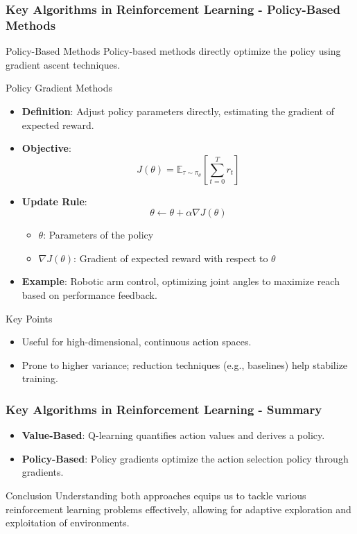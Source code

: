 \documentclass[aspectratio=169]{beamer}
\begin{document}
\begin{frame}[fragile]
  \frametitle{Key Algorithms in Reinforcement Learning - Policy-Based Methods}
  \begin{block}{Policy-Based Methods}
    Policy-based methods directly optimize the policy using gradient ascent techniques.
  \end{block}

  \begin{block}{Policy Gradient Methods}
    \begin{itemize}
      \item \textbf{Definition}: Adjust policy parameters directly, estimating the gradient of expected reward.
      \item \textbf{Objective}:
      \[
      J(\theta) = \mathbb{E}_{\tau \sim \pi_\theta} \left[ \sum_{t=0}^{T} r_t \right]
      \]
      \item \textbf{Update Rule}:
      \[
      \theta \leftarrow \theta + \alpha \nabla J(\theta)
      \]
      \begin{itemize}
        \item \( \theta \): Parameters of the policy
        \item \( \nabla J(\theta) \): Gradient of expected reward with respect to \( \theta \)
      \end{itemize}
      \item \textbf{Example}: Robotic arm control, optimizing joint angles to maximize reach based on performance feedback.
    \end{itemize}
  \end{block}

  \begin{block}{Key Points}
    \begin{itemize}
      \item Useful for high-dimensional, continuous action spaces.
      \item Prone to higher variance; reduction techniques (e.g., baselines) help stabilize training.
    \end{itemize}
  \end{block}
\end{frame}

\begin{frame}[fragile]
  \frametitle{Key Algorithms in Reinforcement Learning - Summary}
  \begin{itemize}
    \item \textbf{Value-Based}: Q-learning quantifies action values and derives a policy.
    \item \textbf{Policy-Based}: Policy gradients optimize the action selection policy through gradients.
  \end{itemize}

  \begin{block}{Conclusion}
    Understanding both approaches equips us to tackle various reinforcement learning problems effectively, allowing for adaptive exploration and exploitation of environments.
  \end{block}
\end{frame}
\end{document}
